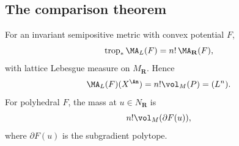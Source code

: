\subsection{The comparison theorem}
\label{sec:ch31-toric-theorem}

\begin{theorem}
\label{thm:toric-bfj-alexandrov}
For an invariant semipositive metric with convex potential \(F\),
\begin{equation}
        \operatorname{trop}_*\MA_L(F)=n!\,\MA_{\mathbf R}(F),
\label{eq:toric-bfj-alexandrov}
\end{equation}
with lattice Lebesgue measure on \(M_\mathbf R\).  Hence
\begin{equation}
        \MA_L(F)(X^{\An})=n!\vol_M(P)=(L^n).
\label{eq:toric-total-mass}
\end{equation}
For polyhedral \(F\), the mass at \(u\in N_\mathbf R\) is
\begin{equation}
                  n!\vol_M(\partial F(u)),
\label{eq:polyhedral-alexandrov-atom}
\end{equation}
where \(\partial F(u)\) is the subgradient polytope.
\end{theorem}

